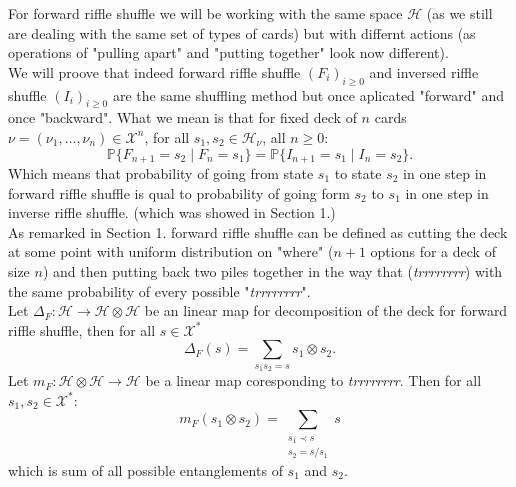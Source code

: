 \documentclass[a4paper]{article}
\begin{document}
For forward riffle shuffle we will be working with the same space $\mathcal{H}$ (as we still
are dealing with the same set of types of cards) but with differnt actions (as operations of "pulling apart"
and "putting together" look now different). \\
We will proove that indeed forward riffle shuffle $(F_i)_{i \geq 0}$ and inversed riffle shuffle
$(I_i)_{i \geq 0}$ are the same shuffling method
but once aplicated "forward" and once "backward". What we mean is that for fixed deck of $n$ cards
$\nu = (\nu_1, \dots, \nu_n) \in \mathcal{X}^n$, for all $s_1, s_2 \in \mathcal{H}_\nu$, all $n \geq 0$:
\begin{equation*}
\mathbb{P}\{F_{n+1} = s_2 \mid F_n = s_1\} = \mathbb{P}\{I_{n+1} = s_1 \mid I_n = s_2\}.
\end{equation*}
Which means that probability of going from state $s_1$ to state $s_2$ in one step in forward riffle shuffle
is qual to probability of going form $s_2$ to $s_1$ in one step in  inverse riffle shuffle. (which was
showed in Section 1.)\\
As remarked in Section 1. forward riffle shuffle can be defined as cutting the deck at some point with
uniform distribution on "where" ($n+1$ options for a deck of size $n$) and then putting back
two piles together in the way that 
(\textit{trrrrrrrr}) with
the same probability of every possible "\textit{trrrrrrrr}". \\

Let $\Delta_F : \mathcal{H} \to \mathcal{H} \otimes \mathcal{H}$ be an linear map for decomposition
of the deck for forward riffle shuffle, then for all $s \in \mathcal{X}^*$
\begin{equation*}
\Delta_F(s) = \sum_{s_1s_2=s} s_1 \otimes s_2.
\end{equation*}
Let $m_F : \mathcal{H} \otimes \mathcal{H} \to \mathcal{H}$ be a linear map coresponding to
\textit{trrrrrrrr}. Then for all $s_1, s_2 \in \mathcal{X}^*$:
\begin{equation*}
m_F (s_1 \otimes s_2) = \sum_{\substack{s_1 \prec s \\ s_2 = s/s_1} } s
\end{equation*}
which is sum of all possible entanglements of $s_1$ and $s_2$.\\[8pt]
\end{document}

